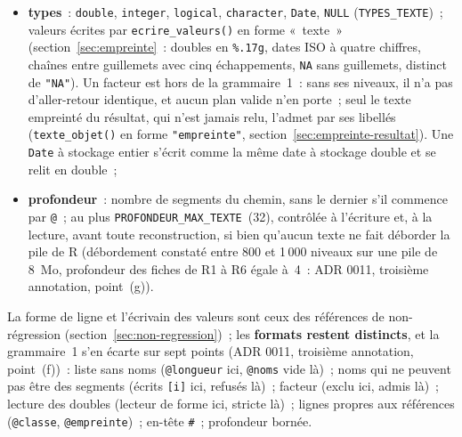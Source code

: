 \documentclass[a4paper,11pt]{article}
\newcommand{\code}[1]{\texttt{\small #1}}
\begin{document}
\begin{itemize}[leftmargin=*, itemsep=2pt]
    un fichier tronqué serait relu comme un objet plus court. Un vecteur
    atomique nommé de longueur~0 est pour cela refusé à l'écriture~: sa ligne
    \code{@noms} seule est aussi l'écriture complète d'une liste nommée vide,
    si bien que son texte privé de la ligne de valeurs serait relu sans refus
    (ADR 0011, seconde annotation du 20/10/2026~; aucun plan valide ni aucune
    fiche du package n'en contient). \textbf{Limite admise}~: un texte édité
    à la main qui porte un tel vecteur est relu sans refus, si bien que le
    lecteur admet un objet que l'écrivain refuse~;
  \item \textbf{types}~: \code{double}, \code{integer}, \code{logical},
    \code{character}, \code{Date}, \code{NULL} (\code{TYPES\_TEXTE})~;
    valeurs écrites par \code{ecrire\_valeurs()} en forme «~texte~»
    (section~\ref{sec:empreinte}~: doubles en \code{\%.17g}, dates ISO à
    quatre chiffres, chaînes entre guillemets avec cinq échappements,
    \code{NA} sans guillemets, distinct de \code{"NA"}). Un facteur est hors
    de la grammaire~1~: sans ses niveaux, il n'a pas d'aller-retour
    identique, et aucun plan valide n'en porte~; seul le texte empreinté du
    résultat, qui n'est jamais relu, l'admet par ses libellés
    (\code{texte\_objet()} en forme \code{"empreinte"},
    section~\ref{sec:empreinte-resultat}). Une \code{Date} à stockage
    entier s'écrit comme la même date à stockage double et se relit en
    double~;
  \item \textbf{profondeur}~: nombre de segments du chemin, sans le dernier
    s'il commence par \code{@}~; au plus \code{PROFONDEUR\_MAX\_TEXTE}~(32),
    contrôlée à l'écriture et, à la lecture, avant toute reconstruction, si
    bien qu'aucun texte ne fait déborder la pile de R (débordement constaté
    entre 800 et 1\,000 niveaux sur une pile de 8~Mo, profondeur des fiches
    de R1 à R6 égale à~4~: ADR 0011, troisième annotation, point~(g)).
\end{itemize}

\noindent
La forme de ligne et l'écrivain des valeurs sont ceux des références de
non-régression (section~\ref{sec:non-regression})~; les \textbf{formats
restent distincts}, et la grammaire~1 s'en écarte sur sept points (ADR 0011,
troisième annotation, point~(f))~: liste sans noms (\code{@longueur} ici,
\code{@noms} vide là)~; noms qui ne peuvent pas être des segments (écrits
\code{[i]} ici, refusés là)~; facteur (exclu ici, admis là)~; lecture des
doubles (lecteur de forme ici, stricte là)~; lignes propres aux références
(\code{@classe}, \code{@empreinte})~; en-tête \code{\#}~; profondeur bornée.
\end{document}
